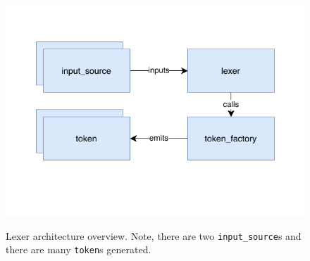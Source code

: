 \begin{figure}[H]
	\centering
	\includegraphics{img/lexer_arch}
	\label{lexer_arch}
	\caption{Lexer architecture overview. Note, there are two \texttt{input\_source}s and there are many \texttt{token}s generated.}
\end{figure}

